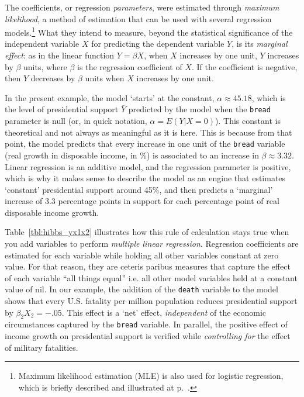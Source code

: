 	The coefficients, or regression \emph{parameters}, were estimated through \emph{maximum likelihood}, a method of estimation that can be used with several regression models.\footnote{Maximum likelihood estimation (MLE) is also used for logistic regression, which is briefly described and illustrated at p.~\pageref{ch:log}.} What they intend to measure, beyond the statistical significance of the independent variable $X$ for predicting the dependent variable $Y$, is its \emph{marginal effect}: as in the linear function $Y=\beta X$, when $X$ increases by one unit, $Y$ increases by $\beta$ units, where $\beta$ is the regression coefficient of $X$. If the coefficient is negative, then $Y$ decreases by $\beta$ units when $X$ increases by one unit.

	In the present example, the model `starts' at the constant, $\alpha \approx 45.18$, which is the level of presidential support $\bar Y$ predicted by the model when the \texttt{bread} parameter is null (or, in quick notation, $\alpha = E(Y|X=0)$). This constant is theoretical and not always as meaningful as it is here. This is because from that point, the model predicts that every increase in one unit of the \texttt{bread} variable (real growth in disposable income, in \%) is associated to an increase in $\beta \approx 3.32$. Linear regression is an additive model, and the regression parameter is positive, which is why it makes sense to describe the model as an engine that estimates `constant' presidential support around 45\%, and then predicts a `marginal' increase of 3.3 percentage points in support for each percentage point of real disposable income growth.
	
	Table~\ref{tbl:hibbs_yx1x2} illustrates how this rule of calculation stays true when you add variables to perform \emph{multiple linear regression}. Regression coefficients are estimated for each variable while holding all other variables constant at zero value. For that reason, they are ceteris paribus measures that capture the effect of each variable ``all things equal'' i.e. all other model variables held at a constant value of nil. In our example, the addition of the \texttt{death} variable to the model shows that every U.S. fatality per million population reduces presidential support by $\beta_2 X_2=-.05$. This effect is a `net' effect, \emph{independent} of the economic circumstances captured by the \texttt{bread} variable. In parallel, the positive effect of income growth on presidential support is verified while \emph{controlling for} the effect of military fatalities.

